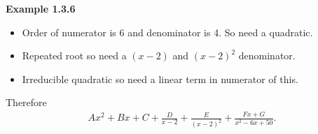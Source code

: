 \vspace{10mm}
\textbf{Example 1.3.6}
\begin{itemize}
    \item Order of numerator is 6 and denominator is 4. So need a quadratic.
    \item Repeated root so need a $(x-2)$ and $(x-2)^2$ denominator.
    \item Irreducible quadratic so need a linear term in numerator of this.
\end{itemize}
Therefore
\begin{align*}
    Ax^2 + Bx + C + \frac{D}{x-2} + \frac{E}{(x-2)^2} + \frac{Fx+G}{x^2-6x+50}.
\end{align*}